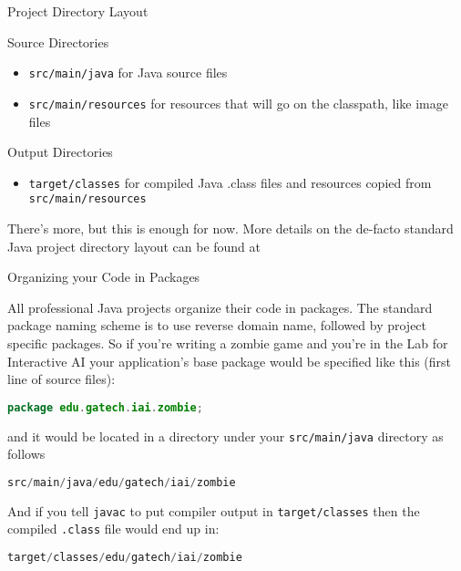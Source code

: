 \documentclass{beamer}
\begin{document}
\begin{frame}[fragile]{Project Directory Layout}


Source Directories
\begin{itemize}
\item {\tt src/main/java} for Java source files
\item {\tt src/main/resources} for resources that will go on the classpath, like image files
\end{itemize}

Output Directories
\begin{itemize}
\item {\tt target/classes} for compiled Java .class files and resources copied from {\tt src/main/resources}
\end{itemize}

There's more, but this is enough for now.  More details on the de-facto standard Java project directory layout can be found at 

\end{frame}

\begin{frame}[fragile]{Organizing your Code in Packages}


All professional Java projects organize their code in packages.  The standard package naming scheme is to use reverse domain name, followed by project specific packages.  So if you're writing a zombie game and you're in the Lab for Interactive AI your application's base package would be specified like this (first line of source files):
\vspace{-.05in}
\begin{lstlisting}[language=Java]
package edu.gatech.iai.zombie;
\end{lstlisting}
and it would be located in a directory under your {\tt src/main/java} directory as follows
\begin{lstlisting}[language=Java]
src/main/java/edu/gatech/iai/zombie
\end{lstlisting}
\vspace{-.05in}
And if you tell {\tt javac} to put compiler output in {\tt target/classes} then the compiled {\tt .class} file would end up in:
\begin{lstlisting}[language=Java]
target/classes/edu/gatech/iai/zombie
\end{lstlisting}

\end{frame}
\end{document}
